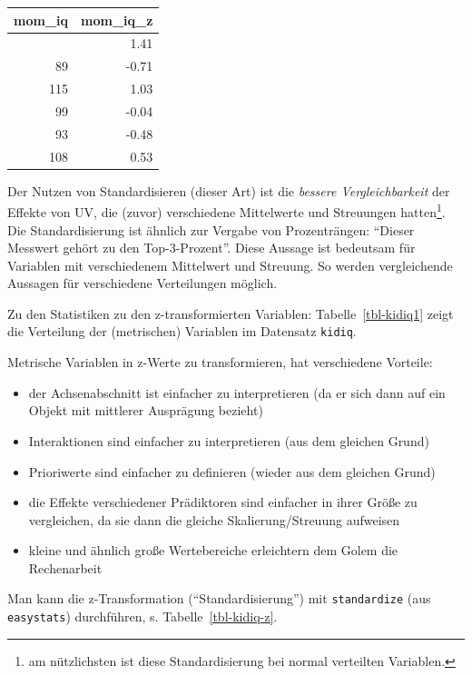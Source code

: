 \documentclass[
  ngerman,
  letterpaper,
  twoside,
  open=any]{scrbook}
\providecommand{\tightlist}{%
  \setlength{\itemsep}{0pt}\setlength{\parskip}{0pt}}\usepackage{longtable,booktabs,array}
\newcounter{none} %
\theoremstyle{definition}
\theoremstyle{plain}
\theoremstyle{definition}
\theoremstyle{definition}
\theoremstyle{definition}
\theoremstyle{definition}
\theoremstyle{remark}
\begin{document}
{\def\LTcaptype{none} %
\begin{longtable}[]{@{}rr@{}}
\toprule\noalign{}
mom\_iq & mom\_iq\_z \\
\midrule\noalign{}
\endhead
\bottomrule\noalign{}
\endlastfoot
121 & 1.41 \\
89 & -0.71 \\
115 & 1.03 \\
99 & -0.04 \\
93 & -0.48 \\
108 & 0.53 \\
\end{longtable}
}

Der Nutzen von Standardisieren (dieser Art) ist die \emph{bessere
Vergleichbarkeit} der Effekte von UV, die (zuvor) verschiedene
Mittelwerte und Streuungen hatten\footnote{am nützlichsten ist diese
  Standardisierung bei normal verteilten Variablen.}. Die
Standardisierung ist ähnlich zur Vergabe von Prozenträngen:
\enquote{Dieser Messwert gehört zu den Top-3-Prozent}. Diese Aussage ist
bedeutsam für Variablen mit verschiedenem Mittelwert und Streuung. So
werden vergleichende Aussagen für verschiedene Verteilungen möglich.

Zu den Statistiken zu den z-transformierten Variablen:
Tabelle~\ref{tbl-kidiq1} zeigt die Verteilung der (metrischen) Variablen
im Datensatz \texttt{kidiq}.

Metrische Variablen in z-Werte zu transformieren, hat verschiedene
Vorteile:

\begin{itemize}
\tightlist
\item
  der Achsenabschnitt ist einfacher zu interpretieren (da er sich dann
  auf ein Objekt mit mittlerer Ausprägung bezieht)
\item
  Interaktionen sind einfacher zu interpretieren (aus dem gleichen
  Grund)
\item
  Prioriwerte sind einfacher zu definieren (wieder aus dem gleichen
  Grund)
\item
  die Effekte verschiedener Prädiktoren sind einfacher in ihrer Größe zu
  vergleichen, da sie dann die gleiche Skalierung/Streuung aufweisen
\item
  kleine und ähnlich große Wertebereiche erleichtern dem Golem die
  Rechenarbeit
\end{itemize}

Man kann die z-Transformation (\enquote{Standardisierung}) mit
\texttt{standardize} (aus \texttt{easystats}) durchführen, s.
Tabelle~\ref{tbl-kidiq-z}.
\end{document}
